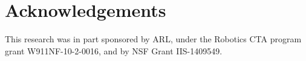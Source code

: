 \documentclass{article}
\begin{document}
\section*{Acknowledgements}
This research was in part sponsored by ARL, under the Robotics CTA program grant W911NF-10-2-0016, and by NSF Grant IIS-1409549.
%



%

%

\end{document}
